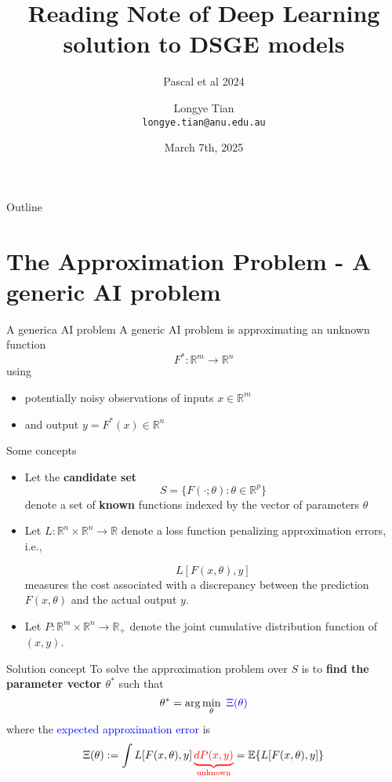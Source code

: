 \documentclass[aspectratio=169]{beamer} %
\title[DP2]{Reading Note of Deep Learning solution to DSGE models}
\subtitle{Pascal et al 2024}
\author[Longye]{Longye Tian \\ \texttt{longye.tian@anu.edu.au}}
\institute[ANU]{Australian National University\\ School of Economics}
\date{March 7th, 2025}
\begin{document}
\begin{frame}
  \titlepage
\end{frame}

\begin{frame}{Outline}
  \tableofcontents
\end{frame}

\section{The Approximation Problem - A generic AI problem}
\begin{frame}{A generica AI problem}
    A generic AI problem is approximating an unknown function
$$
F^*: \mathbb{R}^m \to \mathbb{R}^n
$$
using
\begin{itemize}
    \item potentially noisy observations of inputs $x\in\mathbb{R}^m$
    \item and output $y = F^*(x)\in\mathbb{R}^n$
\end{itemize}
\end{frame}

\begin{frame}{Some concepts}
\begin{itemize}
    \item Let the \textbf{candidate set}
    $$
    S = \{F(\cdot; \theta): \theta\in \mathbb{R}^p\}
    $$
    denote a set of \textbf{known} functions indexed by the vector of parameters $\theta$
    \item Let $L:\mathbb{R}^n\times \mathbb{R}^n\to \mathbb{R}$ denote a loss function penalizing approximation errors, i.e.,
    
    $$L[F(x,\theta), y]$$ 
    measures the cost associated with a discrepancy between the prediction $F(x,\theta)$ and the actual output $y$.
    \item Let $P:\mathbb{R}^m\times \mathbb{R}^n\to \mathbb{R}_+$ denote the joint cumulative distribution function of $(x, y)$.
\end{itemize}
    
\end{frame}

\begin{frame}{Solution concept}
To solve the approximation problem over $S$ is to \textbf{find the parameter vector $\theta^*$} such that
$$
\theta^* = \arg\min_{\theta}\,\, \textcolor{blue}{\Xi(\theta)}
$$
where the \textcolor{blue}{expected approximation error} is
$$
\Xi(\theta):= \int L[F(x,\theta ),y]\,\textcolor{red}{\underbrace{dP(x,y)}_{\text{unknown}}} = \mathbb{E}\{L[F(x,\theta),y]\}
$$

    
\end{frame}
\end{document}
